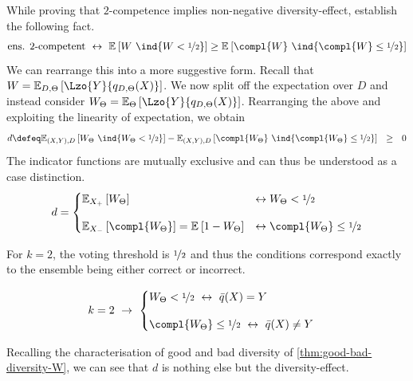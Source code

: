 \documentclass[../main.tex]{subfiles}
\begin{document}
While proving that $2$-competence implies non-negative diversity-effect, \citeauthor{theisen_WhenAreEnsembles_2023} establish the following fact.
\begin{align}
\label{eq:competence-lemma2}
\text{ens. $2$-competent} ~\leftrightarrow~ \mathbb{E}_{}\left[ W~\ind{W < \nicefrac{1}{2}} \right] \geq \mathbb{E}_{}\left[ 
\compl{W}~\ind{\compl{W} \leq \nicefrac{1}{2} } 
\right] 
\end{align}
We can rearrange this into a more suggestive form. Recall that $W = \mathbb{E}_{D, \Theta}\left[ \Lzo{Y}{q_{D,\Theta}(X)} \right]$. We now split off the expectation over $D$ and instead consider $W_{\Theta} = \mathbb{E}_{\Theta}\left[ \Lzo{Y}{q_{D, \Theta}(X)} \right]$. Rearranging the above and exploiting the linearity of expectation, we obtain
$$
d \defeq \mathbb{E}_{(X,Y),D }\left[ W_{\Theta} ~\ind{W_{\Theta} < \nicefrac{1}{2}} \right]  - \mathbb{E}_{(X,Y) ,D}\left[ \compl{W_{\Theta}} ~\ind{\compl{W_{\Theta}} \leq \nicefrac{1}{2} } \right] ~ ~ \geq ~ ~  0
$$
The indicator functions are mutually exclusive and can thus be understood as a case distinction. 
$$
d = 
\begin{cases}
\mathbb{E}_{X_+}\left[ W_{\Theta} \right] & \leftrightarrow W_{\Theta} < \nicefrac{1}{2} \\[1em]
\mathbb{E}_{X_-}\left[ \compl{W_{\Theta}}  \right]  = \mathbb{E}_{}\left[ 1 - W_{\Theta} \right]  & \leftrightarrow \compl{W_{\Theta}} \leq \nicefrac{1}{2} 
\end{cases}
$$

For $k=2$, the voting threshold is $\nicefrac{1}{2}$ and thus the conditions correspond exactly to the ensemble being either correct or incorrect.

\begin{align}
\label{eq:gen-error-ratio-binary}
k = 2 ~\rightarrow~ 
\begin{cases}
W_{\Theta}  < \nicefrac{1}{2} ~\leftrightarrow~  \bar{q}(X) = Y \\[1em]
\compl{W_\Theta }  \leq \nicefrac{1}{2} ~\leftrightarrow~ \bar{q}(X) \not= Y
\end{cases}
\end{align}

Recalling the characterisation of good and bad diversity of \cref{thm:good-bad-diversity-W}, we can see that $d$ is nothing else but the diversity-effect. 
\end{document}
